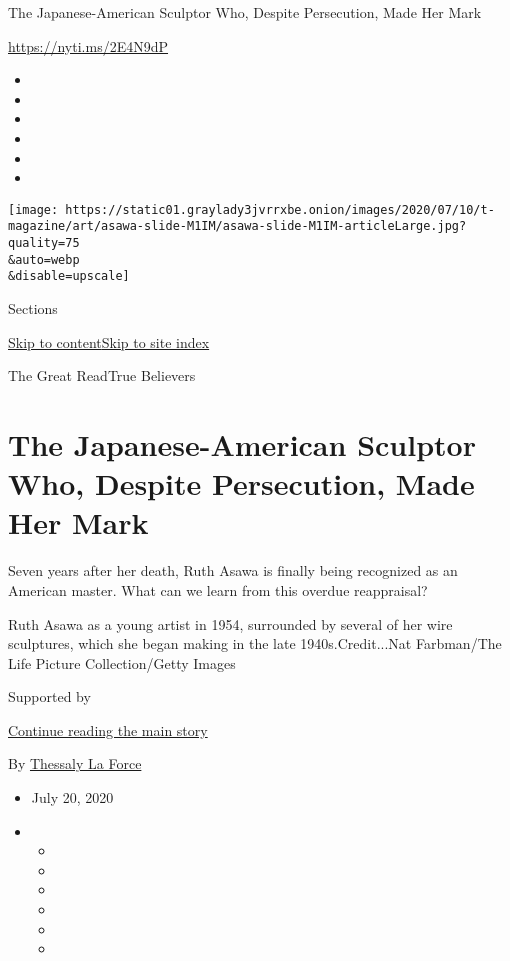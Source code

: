 The Japanese-American Sculptor Who, Despite Persecution, Made Her Mark

\url{https://nyti.ms/2E4N9dP}

\begin{itemize}
\item
\item
\item
\item
\item
\item
\end{itemize}

\texttt{[image: https://static01.graylady3jvrrxbe.onion/images/2020/07/10/t-magazine/art/asawa-slide-M1IM/asawa-slide-M1IM-articleLarge.jpg?quality=75\\\&auto=webp\\\&disable=upscale]}

Sections

\protect\hyperlink{site-content}{Skip to
content}\protect\hyperlink{site-index}{Skip to site index}

The Great ReadTrue Believers

\hypertarget{the-japanese-american-sculptor-who-despite-persecution-made-her-mark}{%
\section{The Japanese-American Sculptor Who, Despite Persecution, Made
Her
Mark}\label{the-japanese-american-sculptor-who-despite-persecution-made-her-mark}}

Seven years after her death, Ruth Asawa is finally being recognized as
an American master. What can we learn from this overdue reappraisal?

Ruth Asawa as a young artist in 1954, surrounded by several of her wire
sculptures, which she began making in the late 1940s.Credit...Nat
Farbman/The Life Picture Collection/Getty Images

Supported by

\protect\hyperlink{after-sponsor}{Continue reading the main story}

By
\href{https://www.nytimes3xbfgragh.onion/by/thessaly-la-force}{Thessaly
La Force}

\begin{itemize}
\item
  July 20, 2020
\item
  \begin{itemize}
  \item
  \item
  \item
  \item
  \item
  \item
  \end{itemize}
\end{itemize}

